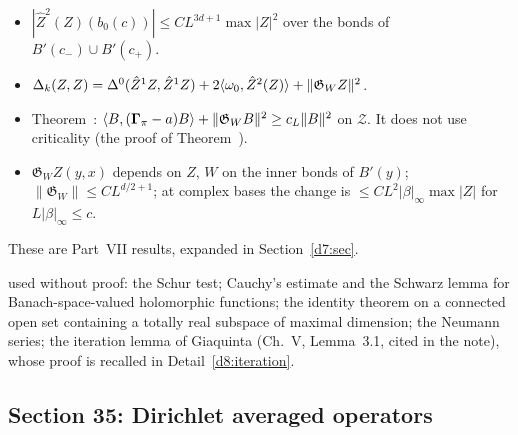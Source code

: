 \begin{description}[style=unboxed,leftmargin=0.8em]
\begin{itemize}
  \item $|\hat Z^2(Z)(b_0(c))|\le CL^{3d+1}\max|Z|^2$ over the bonds of $B'(c_-)\cup B'(c_+)$.
  \item $\Delta_k(Z,Z)=\Delta^0(\hat Z^1Z,\hat Z^1Z)+2\langle \omega_0,\hat Z^2(Z)\rangle+\|\mathfrak G_WZ\|^2$.
  \item Theorem~: $\langle B,(\boldsymbol\Gamma_\pi-a)B\rangle+\|\mathfrak G_WB\|^2\ge c_L\|B\|^2$ on $\mathcal Z$. It does not use criticality (the proof of Theorem~).
  \item $\mathfrak G_WZ(y,x)$ depends on $Z$, $W$ on the inner bonds of $B'(y)$; $\|\mathfrak G_W\|\le CL^{d/2+1}$; at complex bases the change is $\le CL^2|\beta|_\infty\max|Z|$ for $L|\beta|_\infty\le c$.
  \end{itemize}
  These are Part~VII results, expanded in Section~\ref{d7:sec}.
\item[I13. Textbook facts] used without proof: the Schur test; Cauchy's estimate and the Schwarz lemma for Banach-space-valued holomorphic functions; the identity theorem on a connected open set containing a totally real subspace of maximal dimension; the Neumann series; the iteration lemma of Giaquinta (Ch.~V, Lemma~3.1, cited in the note), whose proof is recalled in Detail~\ref{d8:iteration}.
\end{description}

\subsection{Section 35: Dirichlet averaged operators}\label{d8:s35}

